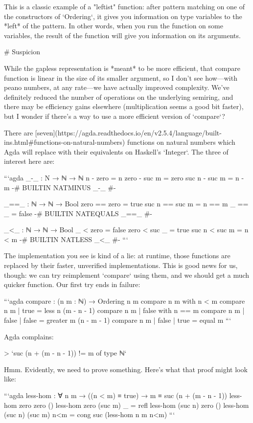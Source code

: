 \documentclass{article}
\begin{document}
This is a classic example of a "leftist" function: after pattern matching on
one of the constructors of `Ordering`, it gives you information on type
variables to the *left* of the pattern. In other words, when you run the
function on some variables, the result of the function will give you
information on its arguments.

# Suspicion

While the gapless representation is *meant* to be more efficient, that compare
function is linear in the size of its smaller argument, so I don't see
how---with peano numbers, at any rate---we have actually improved complexity.
We've definitely reduced the number of operations on the underlying semiring,
and there may be efficiency gains elsewhere (multiplication seems a good bit
faster), but I wonder if there's a way to use a more efficient version of
`compare`?

There are
[seven](https://agda.readthedocs.io/en/v2.5.4/language/built-ins.html#functions-on-natural-numbers)
functions on natural numbers which Agda will replace with their equivalents on
Haskell's `Integer`. The three of interest here are:

```agda
_-_ : N → ℕ → ℕ
n     - zero  = n
zero  - suc m = zero
suc n - suc m = n - m
{-# BUILTIN NATMINUS _-_ #-}

_==_ : ℕ → ℕ → Bool
zero  == zero  = true
suc n == suc m = n == m
_     == _     = false
{-# BUILTIN NATEQUALS _==_ #-}

_<_ : ℕ → ℕ → Bool
_     < zero  = false
zero  < suc _ = true
suc n < suc m = n < m
{-# BUILTIN NATLESS _<_ #-}
```

The implementation you see is kind of a lie: at runtime, those functions are
replaced by their faster, unverified implementations. This is good news for us,
though: we can try reimplement `compare` using them, and we should get a much
quicker function. Our first try ends in failure:

```agda
compare : (n m : ℕ) → Ordering n m
compare n m with n < m
compare n m | true = less n (m - n - 1)
compare n m | false with n == m
compare n m | false | false = greater m (n - m - 1)
compare n m | false | true = equal m
```

Agda complains:

> `suc (n + (m - n - 1)) != m of type ℕ`

Hmm. Evidently, we need to prove something. Here's what that proof might look
like:

```agda
less-hom : ∀ n m → ((n < m) ≡ true) → m ≡ suc (n + (m - n - 1))
less-hom zero zero ()
less-hom zero (suc m) _ = refl
less-hom (suc n) zero ()
less-hom (suc n) (suc m) n<m = cong suc (less-hom n m n<m)
```
\end{document}
